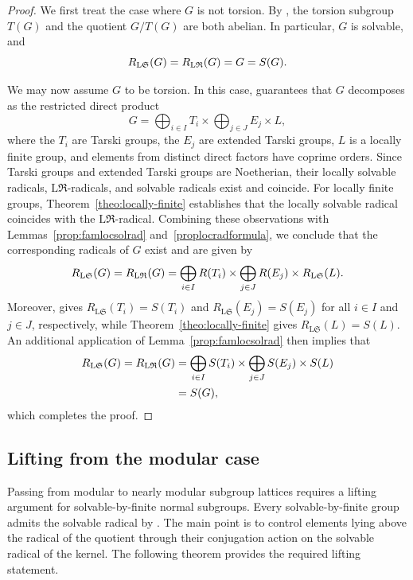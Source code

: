 \documentclass[11pt, reqno]{amsart}
\numberwithin{equation}{section}
\theoremstyle{definition}
\numberwithin{equation}{section}
\begin{document}
\begin{proof}
We first treat the case where $G$ is not torsion. By \cite[Theorems~5 and~6]{Iwasawa}, the torsion subgroup $T(G)$ and the quotient $G/T(G)$ are both abelian. In particular, $G$ is solvable, and
$$R_{\textup{L}\mathfrak{S}}(G) = R_{\textup{L}\mathfrak{R}}(G) = G = S(G).$$


We may now assume $ G $ to be torsion. In this case, \cite[Theorem]{Schmidt_Gruppenmit} guarantees that $ G $ decomposes as the restricted direct product 
$$G =  \bigoplus_{i \in I} T_i  \times  \bigoplus_{j \in J} E_j  \times L,$$
where the $ T_i $ are Tarski groups, the $ E_j $ are extended Tarski groups, $ L $ is a locally finite group, and elements from distinct direct factors have coprime orders.
Since Tarski groups and extended Tarski groups are Noetherian, their locally
solvable radicals, $\mathrm{L}\mathfrak{R}$-radicals, and solvable radicals
exist and coincide. For locally finite groups, Theorem~\ref{theo:locally-finite} establishes that the locally solvable radical coincides with the $\mathrm{L}\mathfrak{R}$-radical. Combining these observations with Lemmas~\ref{prop:famlocsolrad}
and~\ref{proplocradformula}, we conclude that the corresponding radicals
of $G$ exist and are given by $$R_{\textup{L}\mathfrak{S}}(G) = R_{\textup{L}\mathfrak{R}}(G) = \bigoplus_{i \in I} R(T_i) \times \bigoplus_{j \in J} R(E_j) \times R_{\textup{L}\mathfrak{S}}(L).$$ 
Moreover, \cite[Theorem~3.4]{CNH2025} gives
$R_{\mathrm{L}\mathfrak{S}}(T_i)=S(T_i)$ and
$R_{\mathrm{L}\mathfrak{S}}(E_j)=S(E_j)$ for all $i\in I$ and $j\in J$, respectively, while Theorem~\ref{theo:locally-finite} gives $R_{\mathrm{L}\mathfrak{S}}(L)=S(L).$
  An additional application of Lemma~\ref{prop:famlocsolrad} then implies that
\begin{align*}
R_{\textup{L}\mathfrak{S}}(G) =R_{\textup{L}\mathfrak{R}}(G)
&= \bigoplus_{i\in I} S(T_i) \times \bigoplus_{j\in J} S(E_j) \times S(L) \\
&= S(G),
\end{align*}
which completes the proof.
\end{proof}

\subsection{Lifting from the modular case} \hfill

\medskip
Passing from modular to nearly modular subgroup lattices requires a lifting argument for solvable-by-finite normal subgroups. Every solvable-by-finite group admits the solvable radical by \cite[Theorem~2.8]{CNH2025}. The main point is to control elements lying above the radical of the quotient through their conjugation action on the solvable radical of the kernel. The following theorem provides the required lifting statement.
\end{document}
